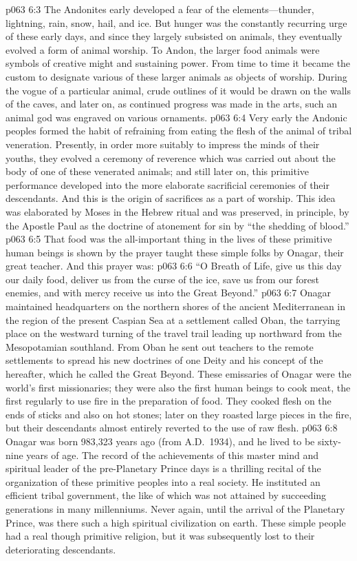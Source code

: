 \vs p063 6:3 The Andonites early developed a fear of the elements---thunder, lightning, rain, snow, hail, and ice. But hunger was the constantly recurring urge of these early days, and since they largely subsisted on animals, they eventually evolved a form of animal worship. To Andon, the larger food animals were symbols of creative might and sustaining power. From time to time it became the custom to designate various of these larger animals as objects of worship. During the vogue of a particular animal, crude outlines of it would be drawn on the walls of the caves, and later on, as continued progress was made in the arts, such an animal god was engraved on various ornaments.
\vs p063 6:4 Very early the Andonic peoples formed the habit of refraining from eating the flesh of the animal of tribal veneration. Presently, in order more suitably to impress the minds of their youths, they evolved a ceremony of reverence which was carried out about the body of one of these venerated animals; and still later on, this primitive performance developed into the more elaborate sacrificial ceremonies of their descendants. And this is the origin of sacrifices as a part of worship. This idea was elaborated by Moses in the Hebrew ritual and was preserved, in principle, by the Apostle Paul as the doctrine of atonement for sin by “the shedding of blood.”
\vs p063 6:5 That food was the all\hyp{}important thing in the lives of these primitive human beings is shown by the prayer taught these simple folks by Onagar, their great teacher. And this prayer was:
\vs p063 6:6 “O Breath of Life, give us this day our daily food, deliver us from the curse of the ice, save us from our forest enemies, and with mercy receive us into the Great Beyond.”
\pc \vs p063 6:7 Onagar maintained headquarters on the northern shores of the ancient Mediterranean in the region of the present Caspian Sea at a settlement called Oban, the tarrying place on the westward turning of the travel trail leading up northward from the Mesopotamian southland. From Oban he sent out teachers to the remote settlements to spread his new doctrines of one Deity and his concept of the hereafter, which he called the Great Beyond. These emissaries of Onagar were the world’s first missionaries; they were also the first human beings to cook meat, the first regularly to use fire in the preparation of food. They cooked flesh on the ends of sticks and also on hot stones; later on they roasted large pieces in the fire, but their descendants almost entirely reverted to the use of raw flesh.
\vs p063 6:8 Onagar was born 983,323 years ago (from A.D.~1934), and he lived to be sixty\hyp{}nine years of age. The record of the achievements of this master mind and spiritual leader of the pre\hyp{}Planetary Prince days is a thrilling recital of the organization of these primitive peoples into a real society. He instituted an efficient tribal government, the like of which was not attained by succeeding generations in many millenniums. Never again, until the arrival of the Planetary Prince, was there such a high spiritual civilization on earth. These simple people had a real though primitive religion, but it was subsequently lost to their deteriorating descendants.
